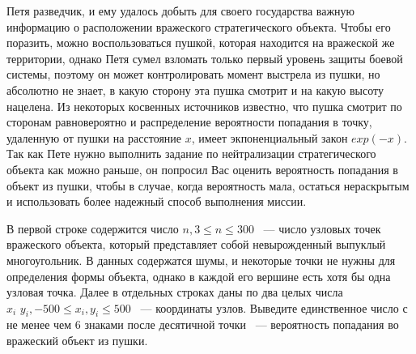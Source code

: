 Петя разведчик, и ему удалось добыть для своего государства
важную информацию о расположении вражеского стратегического
объекта. Чтобы его поразить, можно воспользоваться
пушкой, которая находится на вражеской же территории, однако
Петя сумел взломать только первый уровень защиты боевой
системы, поэтому он может контролировать момент выстрела
из пушки, но абсолютно не знает, в какую сторону эта пушка
смотрит и на какую высоту нацелена. Из некоторых косвенных
источников известно, что пушка смотрит по сторонам равновероятно
и распределение вероятности попадания в точку, удаленную
от пушки на расстояние $x$, имеет экпоненциальный закон
$exp(-x)$. Так как Пете нужно выполнить задание по нейтрализации
стратегического объекта как можно раньше, он попросил Вас
оценить вероятность попадания в объект из пушки, чтобы
в случае, когда вероятность мала, остаться нераскрытым
и использовать более надежный способ выполнения миссии.

\InputFile
В первой строке содержится число $n, 3 \le n \le 300$ ~--- число узловых точек
вражеского объекта, который представляет собой невырожденный выпуклый многоугольник.
В данных содержатся шумы, и некоторые точки не нужны для определения формы
объекта, однако в каждой его вершине есть хотя бы одна узловая точка.
Далее в отдельных строках даны по два целых числа
$x_i\,\,y_i, -500 \le x_i, y_i \le 500$ ~--- координаты узлов.
\OutputFile
Выведите единственное число с не менее чем 6 знаками после десятичной точки
~--- вероятность попадания во вражеский объект из пушки.

